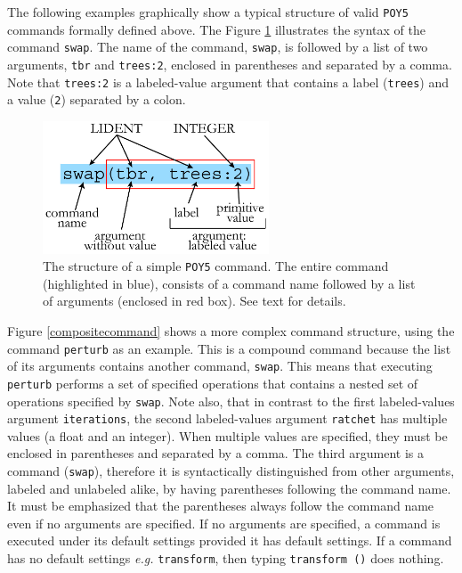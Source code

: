 \documentclass[11pt]{book}
\newcommand{\commandstyle}[1]{\texttt{#1}}
\newcommand{\poycommand}[1]{\commandstyle{#1}}
\newcommand{\poyargument}[1]{\commandstyle{#1}}
\newcommand{\poy}{\commandstyle{POY5}\xspace}
\begin{document}
The following examples graphically show a typical structure of valid \poy commands
formally defined above. The Figure \ref{simplecommand} illustrates
the syntax of the command \poycommand{swap}. The name of the
command, \poycommand{swap}, is followed by a list of two arguments,
\poyargument{tbr} and \poyargument{trees:2}, enclosed in parentheses
and separated by a comma. Note that \poyargument{trees:2} is a labeled-value
argument that contains a label (\texttt{trees}) and a value (\texttt{2})
separated by a colon.

\begin{figure}[htbp]
   \centering
   \includegraphics[width=0.60\textwidth]{doc/figures/fig-poycommand1.jpg}
   \caption{The structure of a simple \poy command. The entire command (highlighted
   in blue), consists of  a command name followed by a list of arguments (enclosed in red box).
   See text for details.}
   \label{simplecommand}
\end{figure}

Figure \ref{compositecommand} shows a more complex command structure, using the command 
\poycommand{perturb} as an example. This is a compound command because the list of its arguments 
contains another command, \poycommand{swap}. This means that executing \poycommand{perturb} 
performs a set of specified operations that contains a nested set of operations specified by \poycommand{swap}. 
Note also, that in contrast to the first labeled-values argument \poyargument{iterations}, the second 
labeled-values argument \poyargument{ratchet} has multiple values (a float and an integer). When 
multiple values are specified, they must be enclosed in parentheses and separated by a comma. The 
third argument is a command (\poycommand{swap}), therefore it is syntactically distinguished from 
other arguments, labeled and unlabeled alike, by having parentheses following the command name. It 
must be emphasized that the parentheses always follow the command name even if no arguments are 
specified. If no arguments are specified, a command is executed under its default settings provided it 
has default settings.  If a command has no default settings \emph{e.g.} \poycommand {transform}, then 
typing \poycommand{transform ()} does nothing. 
\end{document}
